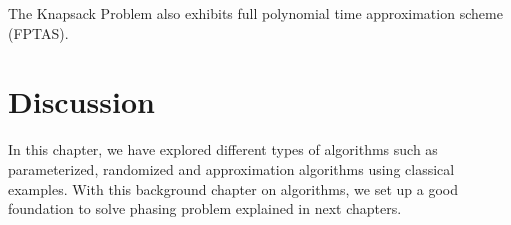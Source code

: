 % 
% 
% 
% 

The Knapsack Problem also exhibits full polynomial time approximation scheme (FPTAS).

\section{Discussion}
In this chapter, we have explored different types of algorithms such as parameterized, randomized and approximation algorithms using classical examples.
With this background chapter on algorithms, we set up a good foundation to solve phasing problem explained in next chapters.

% 
% 

